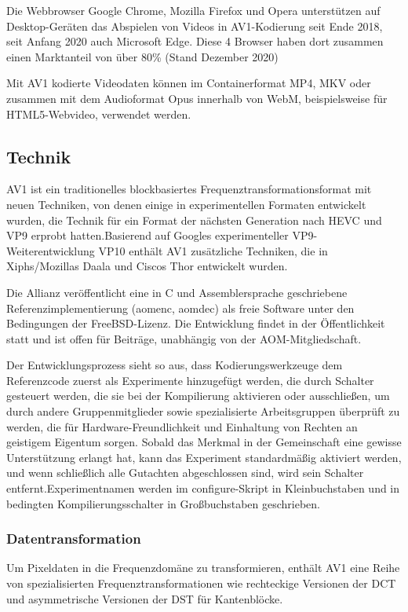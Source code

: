 \documentclass[conference]{IEEEtran}
\begin{document}
Die Webbrowser Google Chrome, Mozilla Firefox und Opera unterstützen auf Desktop-Geräten das Abspielen von Videos in AV1-Kodierung seit Ende 2018, seit Anfang 2020 auch Microsoft Edge. Diese 4 Browser haben dort zusammen einen Marktanteil von über 80\% (Stand Dezember 2020)

Mit AV1 kodierte Videodaten können im Containerformat MP4, MKV oder zusammen mit dem Audioformat Opus innerhalb von WebM, beispielsweise für HTML5-Webvideo, verwendet werden.
\subsection{Technik}
AV1 ist ein traditionelles blockbasiertes Frequenztransformationsformat mit neuen Techniken, von denen einige in experimentellen Formaten entwickelt wurden, die Technik für ein Format der nächsten Generation nach HEVC und VP9 erprobt hatten.Basierend auf Googles experimenteller VP9-Weiterentwicklung VP10 enthält AV1 zusätzliche Techniken, die in Xiphs/Mozillas Daala und Ciscos Thor entwickelt wurden.

Die Allianz veröffentlicht eine in C und Assemblersprache geschriebene Referenzimplementierung (aomenc, aomdec) als freie Software unter den Bedingungen der FreeBSD-Lizenz. Die Entwicklung findet in der Öffentlichkeit statt und ist offen für Beiträge, unabhängig von der AOM-Mitgliedschaft.

Der Entwicklungsprozess sieht so aus, dass Kodierungswerkzeuge dem Referenzcode zuerst als Experimente hinzugefügt werden, die durch Schalter gesteuert werden, die sie bei der Kompilierung aktivieren oder ausschließen, um durch andere Gruppenmitglieder sowie spezialisierte Arbeitsgruppen überprüft zu werden, die für Hardware-Freundlichkeit und Einhaltung von Rechten an geistigem Eigentum sorgen. Sobald das Merkmal in der Gemeinschaft eine gewisse Unterstützung erlangt hat, kann das Experiment standardmäßig aktiviert werden, und wenn schließlich alle Gutachten abgeschlossen sind, wird sein Schalter entfernt.Experimentnamen werden im configure-Skript in Kleinbuchstaben und in bedingten Kompilierungsschalter in Großbuchstaben geschrieben.

\subsubsection{Datentransformation}
Um Pixeldaten in die Frequenzdomäne zu transformieren, enthält AV1 eine Reihe von spezialisierten Frequenztransformationen wie rechteckige Versionen der DCT und asymmetrische Versionen der DST für Kantenblöcke.
\end{document}

